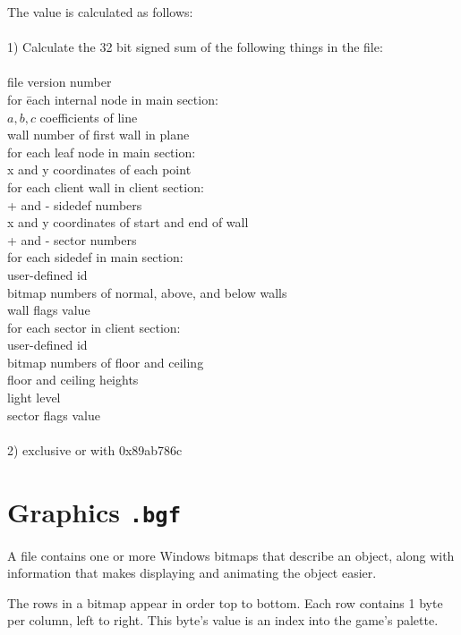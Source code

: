 \begin{tabbing}
The  value is calculated as follows: \\
\\
1) Calculate the 32 bit signed sum of the following things in the
file: \\
\\
file version number \\
for \= each internal node in main section: \\
\>$a, b, c$ coefficients of line \\
\>wall number of first wall in plane \\
for each leaf node in main section: \\
\>x and y coordinates of each point \\
for each client wall in client section: \\
\>+ and - sidedef numbers \\
\>x and y coordinates of start and end of wall \\
\>+ and - sector numbers \\
for each sidedef in main section: \\
\>user-defined id  \\
\>bitmap numbers of normal, above, and below walls \\
\>wall flags value \\
for each sector in client section: \\
\>user-defined id \\
\>bitmap numbers of floor and ceiling \\
\>floor and ceiling heights \\
\>light level \\
\>sector flags value \\
\\
2) exclusive or with 0x89ab786c \\
\end{tabbing}

\section{Graphics {\tt .bgf}}

A \bgf file contains one or more Windows bitmaps that describe an
object, along with information that makes displaying and animating the
object easier.

The rows in a bitmap appear in order top to bottom.  Each row contains
1 byte per column, left to right.  This byte's value is an index into
the game's palette.

